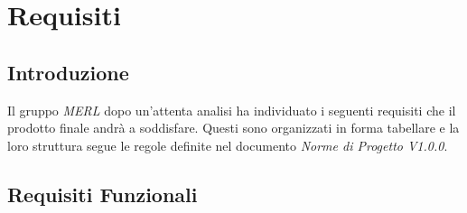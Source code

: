 \chapter{Requisiti}

\renewcommand\arraystretch{1,5}

\section{Introduzione}
Il gruppo \textit{MERL} dopo un'attenta analisi ha individuato i seguenti requisiti che il prodotto finale andrà a soddisfare. Questi sono organizzati in forma tabellare e la loro struttura segue le regole definite nel documento \textit{Norme di Progetto V1.0.0}.

\section{Requisiti Funzionali}


